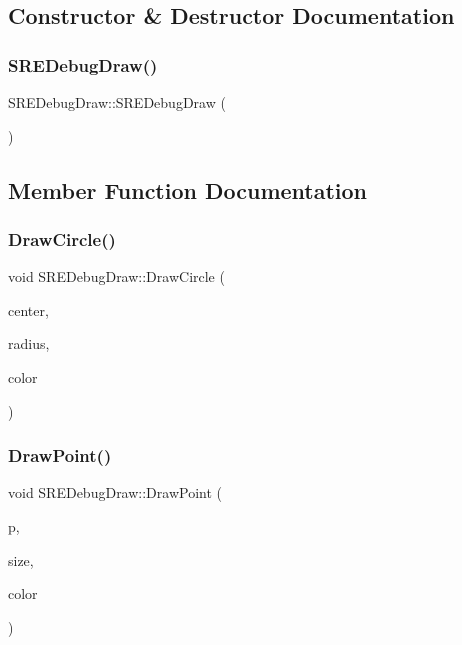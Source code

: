 \subsection{Constructor \& Destructor Documentation}
\hypertarget{class_s_r_e_debug_draw_a6b4f4f7d72bb85ea3bfecd282786693a}{}\label{class_s_r_e_debug_draw_a6b4f4f7d72bb85ea3bfecd282786693a} 
\subsubsection{\texorpdfstring{S\+R\+E\+Debug\+Draw()}{SREDebugDraw()}}
{\footnotesize\ttfamily S\+R\+E\+Debug\+Draw\+::\+S\+R\+E\+Debug\+Draw (\begin{DoxyParamCaption}{ }\end{DoxyParamCaption})}



\subsection{Member Function Documentation}
\hypertarget{class_s_r_e_debug_draw_a6cb71e10d252900e6f469389146b9f48}{}\label{class_s_r_e_debug_draw_a6cb71e10d252900e6f469389146b9f48} 
\subsubsection{\texorpdfstring{Draw\+Circle()}{DrawCircle()}}
{\footnotesize\ttfamily void S\+R\+E\+Debug\+Draw\+::\+Draw\+Circle (\begin{DoxyParamCaption}\item[{const b2\+Vec2 \&}]{center,  }\item[{float32}]{radius,  }\item[{const b2\+Color \&}]{color }\end{DoxyParamCaption})}

\hypertarget{class_s_r_e_debug_draw_aaa826d0f196accca390c47023d28e2ce}{}\label{class_s_r_e_debug_draw_aaa826d0f196accca390c47023d28e2ce} 
\subsubsection{\texorpdfstring{Draw\+Point()}{DrawPoint()}}
{\footnotesize\ttfamily void S\+R\+E\+Debug\+Draw\+::\+Draw\+Point (\begin{DoxyParamCaption}\item[{const b2\+Vec2 \&}]{p,  }\item[{float32}]{size,  }\item[{const b2\+Color \&}]{color }\end{DoxyParamCaption})}

